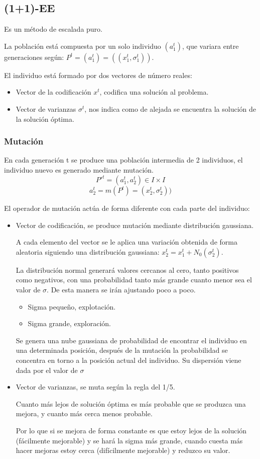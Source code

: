 \documentclass[12pt, twoside, openright]{report} %
\begin{document}
\subsection{(1+1)-EE}
Es un método de escalada puro.

La población está compuesta por un solo individuo $(a_1^t)$, que variara entre generaciones según: $P^t=(a^t_1)=((x^t_1, \sigma^t_1))$.

El individuo está formado por dos vectores de número reales: 
\begin{itemize}
	\item Vector de la codificación $x^t$, codifica una solución al problema.
	\item Vector de varianzas $\sigma^t$, nos indica como de alejada se encuentra la solución de la solución óptima.
\end{itemize}

\subsubsection{Mutación}
En cada generación t se produce una población intermedia de 2 individuos, el individuo nuevo es generado  mediante mutación.
$$P'^t=(a^t_1,a^t_2)\in I \times I$$
$$a^t_2=m(P^t)=(x^t_2, \sigma^t_2))$$

El operador de mutación actúa de forma diferente con cada parte del individuo:
\begin{itemize}
	\item Vector de codificación, se produce mutación mediante distribución gaussiana.
	
	A cada elemento del vector se le aplica una variación obtenida de forma aleatoria siguiendo una distribución gaussiana: $x^t_2=x^t_1+N_0(\sigma^t_2)$.

	La distribución normal generará valores cercanos al cero, tanto positivos como negativos, con una probabilidad tanto más grande cuanto menor sea el valor de $\sigma$. De esta manera se irán ajustando poco a poco.
	\begin{itemize}
		\item Sigma pequeño, explotación.
		\item Sigma grande, exploración.
	\end{itemize}

	Se genera una nube gaussiana de probabilidad de encontrar el individuo en una determinada posición, después de la mutación la probabilidad se concentra en torno a la posición actual del individuo. Su dispersión viene dada por el valor de $\sigma$

	\item Vector de varianzas, se muta según la regla del 1/5.
	
	Cuanto más lejos de solución óptima es más probable que se produzca una mejora, y cuanto más cerca menos probable.
	
	Por lo que si se mejora de forma constante es que estoy lejos de la solución (fácilmente mejorable) y se hará la sigma más grande, cuando cuesta más hacer mejoras estoy cerca (difícilmente mejorable) y reduzco su valor.
\end{itemize}
\end{document}
